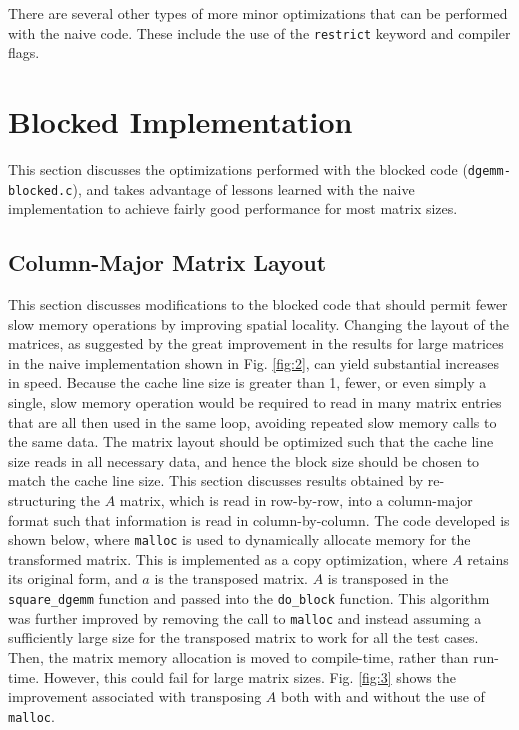 \documentclass[10pt]{article}
\begin{document}
There are several other types of more minor optimizations that can be performed with the naive code. These include the use of the {\tt restrict} keyword and compiler flags. 

\section{Blocked Implementation}

This section discusses the optimizations performed with the blocked code ({\tt dgemm-blocked.c}), and takes advantage of lessons learned with the naive implementation to achieve fairly good performance for most matrix sizes.

\subsection{Column-Major Matrix Layout}
\label{sec:ColumnLayout}
This section discusses modifications to the blocked code that should permit fewer slow memory operations by improving spatial locality. Changing the layout of the matrices, as suggested by the great improvement in the results for large matrices in the naive implementation shown in Fig. \ref{fig:2}, can yield substantial increases in speed. Because the cache line size is greater than 1, fewer, or even simply a single, slow memory operation would be required to read in many matrix entries that are all then used in the same loop, avoiding repeated slow memory calls to the same data. The matrix layout should be optimized such that the cache line size reads in all necessary data, and hence the block size should be chosen to match the cache line size. This section discusses results obtained by re-structuring the \(A\) matrix, which is read in row-by-row, into a column-major format such that information is read in column-by-column. The code developed is shown below, where {\tt malloc} is used to dynamically allocate memory for the transformed matrix. This is implemented as a copy optimization, where \(A\) retains its original form, and \(a\) is the transposed matrix. \(A\) is transposed in the {\tt square\_dgemm} function and passed into the {\tt do\_block} function. This algorithm was further improved by removing the call to {\tt malloc} and instead assuming a sufficiently large size for the transposed matrix to work for all the test cases. Then, the matrix memory allocation is moved to compile-time, rather than run-time. However, this could fail for large matrix sizes. Fig. \ref{fig:3} shows the improvement associated with transposing \(A\) both with and without the use of {\tt malloc}.
\end{document}
